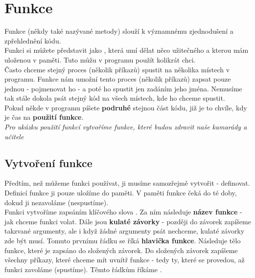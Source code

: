 \section{Funkce}
Funkce (někdy také nazývané metody) slouží k významnému zjednodušení a zpřehlednění kódu.\\
Funkci si můžete představit jako , která umí dělat něco užitečného a kterou mám uloženou v paměti. Tuto  můžu v programu použít kolikrát chci.\\
Často chceme stejný proces (několik příkazů) spustit na několika místech v programu. Funkce nám umožní tento proces (několik příkazů) zapsat pouze jednou - pojmenovat ho - a poté ho spustit jen zadáním jeho jména. Nemusíme tak stále dokola psát stejný kód na všech místech, kde ho chceme spustit.\\
Pokud někde v programu píšete \textbf{podruhé} stejnou část kódu, již je to chvíle, kdy je čas na \textbf{použití funkce}.\\

\vspace{1cm}
\textit{Pro ukázku použití funkcí vytvoříme funkce, které budou zdravit naše kamarády a učitele}

\subsection{Vytvoření funkce}
Předtím, než můžeme funkci používat, ji musíme samozřejmě vytvořit - definovat. Definicí funkce ji pouze uložíme do paměti. V paměti funkce čeká do té doby, dokud ji nezavoláme (nespustíme).\\ 
Funkci vytvoříme zapsáním klíčového slova . Za ním následuje \textbf{název funkce} - jak chceme funkci volat. Dále jsou \textbf{kulaté závorky} - později do závorek zapíšeme takzvané argumenty, ale i když žádné argumenty psát nechceme, kulaté závorky zde být musí. Tomuto prvnímu řádku se říká \textbf{hlavička funkce}. Následuje tělo funkce, které je zapsáno do složených závorek. Do složených závorek zapíšeme všechny příkazy, které chceme mít uvnítř funkce - tedy ty, které se provedou, až funkci zavoláme (spustíme). Těmto řádkům říkáme .\\


